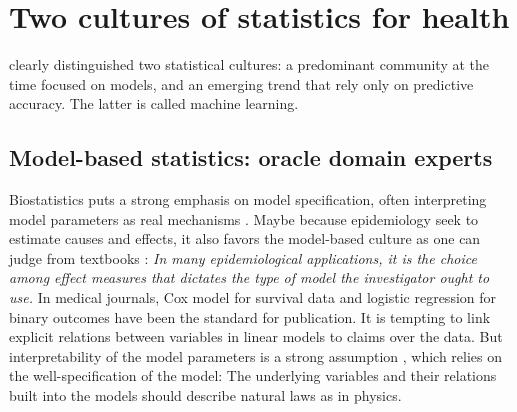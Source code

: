 \documentclass[french,12pt,twoside,a4paper]{book}
\begin{document}
\section{Two cultures of statistics for health}\label{sec:intro:two_cultures}

\cite{breiman2001statistical} clearly distinguished two statistical cultures: a
predominant community at the time focused on models, and an emerging trend that
rely only on predictive accuracy. The latter is called machine learning.

\subsection{Model-based statistics: oracle domain experts}%
\label{subsec:intro:biostatistics_framework}

Biostatistics puts a strong emphasis on model specification, often interpreting
model parameters as real mechanisms \citep{cox2001statistical}. Maybe because
epidemiology seek to estimate causes and effects, it also favors the model-based
culture as one can judge from textbooks \citep{rothman2012epidemiology}:
\textit{In many epidemiological applications, it is the choice among effect
  measures that dictates the type of model the investigator ought to use.} In
medical journals, Cox model for survival data and logistic regression for binary
outcomes have been the standard for publication. %
It is tempting to link explicit relations between variables in linear models to
claims over the data. But interpretability of the model parameters is a strong
assumption \citep{lipton2018mythos}, which relies on the well-specification of
the model: The underlying variables and their relations built into the models
should describe natural laws as in physics.

\end{document}
